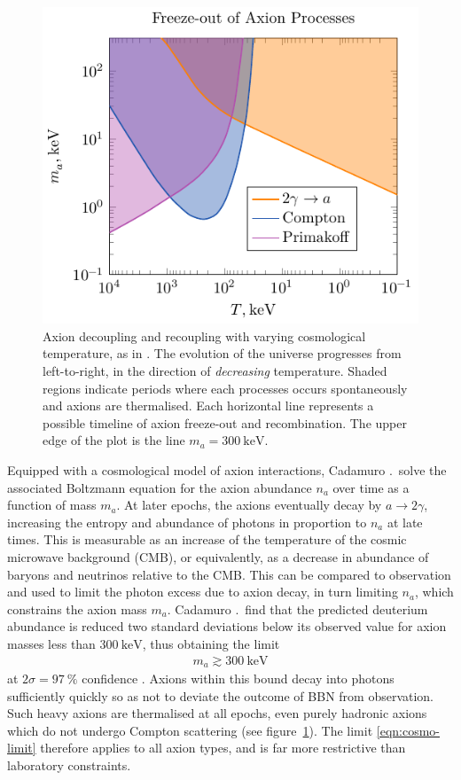 \begin{figure}
	\centering
	\includegraphics{diagrams/cosmo-freeze-out.pdf}
	\caption{
		Axion decoupling and recoupling with varying cosmological temperature, as in \cite{Cadamuro_2011}.
		The evolution of the universe progresses from left-to-right, in the direction of \emph{decreasing} temperature.
		Shaded regions indicate periods where each processes occurs spontaneously and axions are thermalised.
		Each horizontal line represents a possible timeline of axion freeze-out and recombination.
		The upper edge of the plot is the line $m_a = \SI{300}{\kilo\eV}$.
	}
	\label{fig:axion-freeze-out}
\end{figure}


Equipped with a cosmological model of axion interactions, Cadamuro \etal.\ solve the associated Boltzmann equation for the axion abundance $n_a$ over time as a function of mass $m_a$.
At later epochs, the axions eventually decay by $a \to 2γ$, increasing the entropy and abundance of photons in proportion to $n_a$ at late times.
This is measurable as an increase of the temperature of the cosmic microwave background (CMB), or equivalently, as a decrease in abundance of baryons and neutrinos relative to the CMB.
This can be compared to observation and used to limit the photon excess due to axion decay, in turn limiting $n_a$, which constrains the axion mass $m_a$.
Cadamuro \etal.\ find that the predicted deuterium abundance is reduced two standard deviations below its observed value for axion masses less than $\SI{300}{\kilo\eV}$, thus obtaining the limit
\begin{align}
	m_a \gtrsim \SI{300}{\kilo\eV}
	\label{eqn:cosmo-limit}
\end{align}
at $2σ = \SI{97}{\percent}$ confidence \cite{Cadamuro_2011}.
Axions within this bound decay into photons sufficiently quickly so as not to deviate the outcome of BBN from observation.
Such heavy axions are thermalised at all epochs, even purely hadronic axions which do not undergo Compton scattering (see figure~\ref{fig:axion-freeze-out}).
The limit \eqref{eqn:cosmo-limit} therefore applies to all axion types, and is far more restrictive than laboratory constraints.




